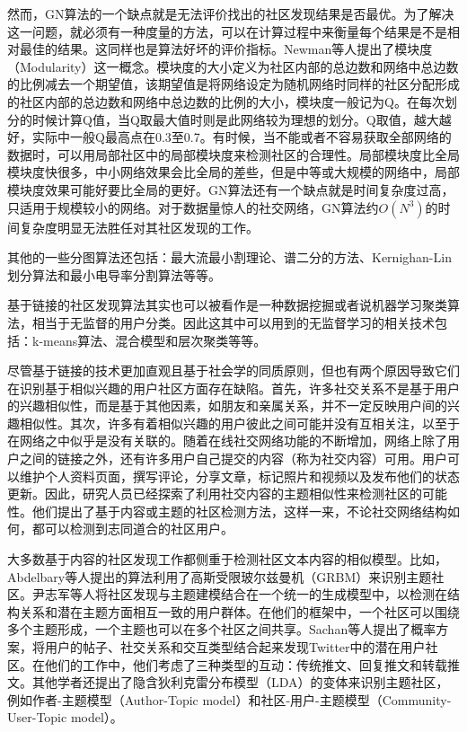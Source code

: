 然而，GN算法的一个缺点就是无法评价找出的社区发现结果是否最优。为了解决这一问题，就必须有一种度量的方法，可以在计算过程中来衡量每个结果是不是相对最佳的结果。这同样也是算法好坏的评价指标。Newman等人提出了模块度（Modularity）\cite{NewmanFind}这一概念。模块度的大小定义为社区内部的总边数和网络中总边数的比例减去一个期望值，该期望值是将网络设定为随机网络时同样的社区分配形成的社区内部的总边数和网络中总边数的比例的大小，模块度一般记为Q。在每次划分的时候计算Q值，当Q取最大值时则是此网络较为理想的划分。Q取值，越大越好，实际中一般Q最高点在0.3至0.7。有时候，当不能或者不容易获取全部网络的数据时，可以用局部社区中的局部模块度来检测社区的合理性。局部模块度比全局模块度快很多，中小网络效果会比全局的差些，但是中等或大规模的网络中，局部模块度效果可能好要比全局的更好。GN算法还有一个缺点就是时间复杂度过高，只适用于规模较小的网络。对于数据量惊人的社交网络，GN算法约$O(N^3)$的时间复杂度明显无法胜任对其社区发现的工作。

其他的一些分图算法还包括：最大流最小割理论\cite{Jr2009Maximal}、谱二分的方法\cite{Pothen1990Partitioning}、Kernighan-Lin划分算法\cite{Kernigan1970An}和最小电导率分割算法\cite{Leskovec2005Graphs}等等。

基于链接的社区发现算法其实也可以被看作是一种数据挖掘或者说机器学习聚类算法，相当于无监督的用户分类。因此这其中可以用到的无监督学习的相关技术包括：k-means算法、混合模型和层次聚类等等。

尽管基于链接的技术更加直观且基于社会学的同质原则，但也有两个原因导致它们在识别基于相似兴趣的用户社区方面存在缺陷。首先，许多社交关系不是基于用户的兴趣相似性，而是基于其他因素，如朋友和亲属关系，并不一定反映用户间的兴趣相似性。其次，许多有着相似兴趣的用户彼此之间可能并没有互相关注，以至于在网络之中似乎是没有关联的\cite{Deng2013Interaction}。随着在线社交网络功能的不断增加，网络上除了用户之间的链接之外，还有许多用户自己提交的内容（称为社交内容）可用。用户可以维护个人资料页面，撰写评论，分享文章，标记照片和视频以及发布他们的状态更新。因此，研究人员已经探索了利用社交内容的主题相似性来检测社区的可能性。他们提出了基于内容或主题的社区检测方法，这样一来，不论社交网络结构如何，都可以检测到志同道合的社区用户\cite{Natarajan2013Community}。

大多数基于内容的社区发现工作都侧重于检测社区文本内容的相似模型。比如，Abdelbary等人提出的算法\cite{Abdelbary2014Utilizing}利用了高斯受限玻尔兹曼机（GRBM）来识别主题社区。尹志军等人\cite{Yin2012Latent}将社区发现与主题建模结合在一个统一的生成模型中，以检测在结构关系和潜在主题方面相互一致的用户群体。在他们的框架中，一个社区可以围绕多个主题形成，一个主题也可以在多个社区之间共享。Sachan等人\cite{Sachan2012Using}提出了概率方案，将用户的帖子、社交关系和交互类型结合起来发现Twitter中的潜在用户社区。在他们的工作中，他们考虑了三种类型的互动：传统推文、回复推文和转载推文。其他学者还提出了隐含狄利克雷分布模型（LDA）的变体来识别主题社区，例如作者-主题模型（Author-Topic model）\cite{RosenZvi2012The}和社区-用户-主题模型（Community-User-Topic model）\cite{Zhou2006Probabilistic}。


